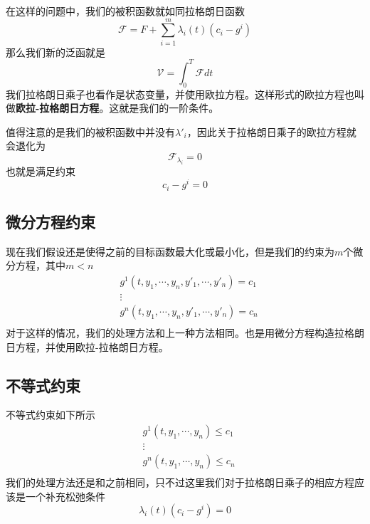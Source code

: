 \documentclass[UTF8,12pt]{ctexart}
\numberwithin{equation}{section} %
\numberwithin{figure}{section}
\numberwithin{table}{section}
\begin{document}
	在这样的问题中，我们的被积函数就如同拉格朗日函数
	\begin{equation}
		\mathscr{F} = F + \sum_{i=1}^{m}\lambda_i(t)(c_i - g^i)
	\end{equation}
	那么我们新的泛函就是
	\begin{equation}
		\mathscr{V} = \int_{0}^{T}\mathscr{F}dt
	\end{equation}
	我们拉格朗日乘子也看作是状态变量，并使用欧拉方程。这样形式的欧拉方程也叫做\textbf{欧拉-拉格朗日方程}。这就是我们的一阶条件。
	
	值得注意的是我们的被积函数中并没有$\lambda'_i$，因此关于拉格朗日乘子的欧拉方程就会退化为
	\begin{equation}
		\mathscr{F}_{\lambda_i} = 0
	\end{equation}
	也就是满足约束
	\begin{equation}
		c_i - g^i = 0
	\end{equation}
	
	\subsection{微分方程约束}
	现在我们假设还是使得之前的目标函数最大化或最小化，但是我们的约束为$m$个微分方程，其中$m<n$
	\begin{equation}
		\begin{aligned}
			&g^1(t,y_1,\cdots,y_n,y'_1,\cdots,y'_n) = c_1 \\
			&\vdots \\
			&g^n(t,y_1,\cdots,y_n,y'_1,\cdots,y'_n) = c_n \\
		\end{aligned}
	\end{equation}
	对于这样的情况，我们的处理方法和上一种方法相同。也是用微分方程构造拉格朗日方程，并使用欧拉-拉格朗日方程。
	
	\subsection{不等式约束}
	不等式约束如下所示
	\begin{equation}
		\begin{aligned}
			&g^1(t,y_1,\cdots,y_n) \leqslant c_1 \\
			&\vdots \\
			&g^n(t,y_1,\cdots,y_n) \leqslant c_n \\
		\end{aligned}
	\end{equation}
	我们的处理方法还是和之前相同，只不过这里我们对于拉格朗日乘子的相应方程应该是一个补充松弛条件
	\begin{equation}
		\lambda_i(t)(c_i - g^i) = 0
	\end{equation}
	
\end{document}

